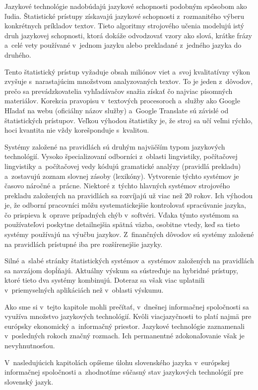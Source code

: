 \begin{multicols}{2}
Jazykové technológie nadobúdajú jazykové schopnosti podobným spôsobom ako ľudia. Štatistické prístupy získavajú jazykové schopnosti z~rozmanitého výberu konkrétnych príkladov textov. Tieto algoritmy strojového učenia modelujú istý druh jazykovej schopnosti, ktorá dokáže odvodzovať vzory ako slová, krátke frázy a~celé vety používané v~jednom jazyku alebo prekladané z~jedného jazyka do druhého.  


Tento štatistický prístup vyžaduje obsah miliónov viet a~svoj kvalitatívny výkon zvyšuje s~narastajúcim množstvom analyzovaných textov. To je jeden z~dôvodov, prečo sa prevádzkovatelia vyhľadávačov snažia získať čo najviac písomných materiálov. Korekcia pravopisu v~textových procesoroch a~služby ako Google Hľadať na webu (oficiálny názov služby) a~Google Translate sú závislé od štatistických prístupov. Veľkou výhodou štatistiky je, že stroj sa učí veľmi rýchlo, hoci kvantita nie vždy korešponduje s~kvalitou.

Systémy založené na pravidlách sú druhým najväčším typom jazykových technológií. Vysoko špecializovaní odborníci z~oblasti lingvistiky, počítačovej lingvistiky a~počítačovej vedy kódujú gramatické analýzy (pravidlá prekladu) a~zostavujú zoznam slovnej zásoby (lexikóny). Vytvorenie týchto systémov je časovo náročné a~prácne. Niektoré z~týchto hlavných systémov strojového prekladu založených na pravidlách sa  rozvíjajú už viac než 20 rokov. Ich výhodou je, že odborní pracovníci môžu systematickejšie kontrolovať spracúvanie jazyka, čo prispieva k~oprave prípadných chýb v~softvéri. Vďaka týmto systémom sa používateľovi poskytne detailnejšia spätná väzba, osobitne vtedy, keď sa tieto systémy používajú na výučbu jazykov. Z~finančných dôvodov sú systémy založené na pravidlách prístupné iba pre rozšírenejšie jazyky.

Silné a~slabé stránky štatistických systémov a~systémov založených na pravidlách sa navzájom dopĺňajú. Aktuálny výskum sa sústreďuje na hybridné prístupy, ktoré tieto dva systémy kombinujú. Doteraz sa však viac uplatnili v~priemyselných aplikáciách než v~oblasti výskumu.

Ako sme si v~tejto kapitole mohli prečítať, v~dnešnej informačnej spoločnosti sa využíva množstvo jazykových technológií. Kvôli viacjazyčnosti to platí najmä pre európsky ekonomický a~informačný priestor. Jazykové technológie zaznamenali v~posledných rokoch značný rozmach. Ich permanentné zdokonaľovanie však je nevyhnutnosťou.

V~nasledujúcich kapitolách opíšeme úlohu slovenského jazyka v~európskej informačnej spoločnosti a~zhodnotíme súčasný stav jazykových technológií pre slovenský jazyk.

\end{multicols}

